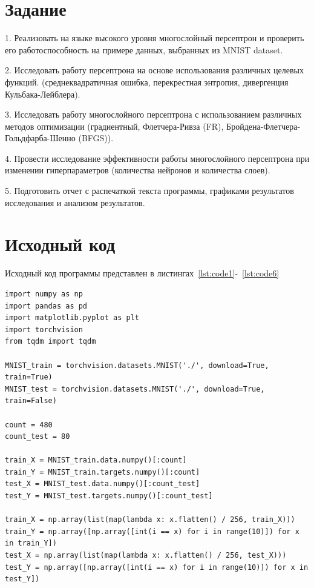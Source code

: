 \documentclass[a4paper, 14pt]{extarticle}
\begin{document}
\renewcommand{\ttdefault}{pcr}

\setlength{\tabcolsep}{3pt}
\newpage
\setcounter{page}{2}

\section{Задание}\label{Sect::task}
1. Реализовать на языке высокого уровня многослойный персептрон и 
проверить его работоспособность на примере данных, выбранных из 
MNIST dataset. 

2. Исследовать работу персептрона на основе использования различных 
целевых функций. (среднеквадратичная ошибка, перекрестная 
энтропия, дивергенция Кульбака-Лейблера).

3. Исследовать работу многослойного персептрона с использованием 
различных методов оптимизации (градиентный, Флетчера-Ривза (FR), 
Бройдена-Флетчера-Гольдфарба-Шенно (BFGS)).

4. Провести исследование эффективности работы многослойного 
персептрона при изменении гиперпараметров (количества нейронов и 
количества слоев).

5. Подготовить отчет с распечаткой текста программы, графиками 
результатов исследования и анализом результатов.
\newpage
\section{Исходный код}

Исходный код программы представлен в листингах~\ref{lst:code1}-~\ref{lst:code6}

\begin{lstlisting}[language={},caption={Подготовка датасета},label={lst:code1}, breaklines=true]
import numpy as np
import pandas as pd
import matplotlib.pyplot as plt
import torchvision
from tqdm import tqdm

MNIST_train = torchvision.datasets.MNIST('./', download=True, train=True)
MNIST_test = torchvision.datasets.MNIST('./', download=True, train=False)

count = 480
count_test = 80

train_X = MNIST_train.data.numpy()[:count]
train_Y = MNIST_train.targets.numpy()[:count]
test_X = MNIST_test.data.numpy()[:count_test]
test_Y = MNIST_test.targets.numpy()[:count_test]

train_X = np.array(list(map(lambda x: x.flatten() / 256, train_X)))
train_Y = np.array([np.array([int(i == x) for i in range(10)]) for x in train_Y])
test_X = np.array(list(map(lambda x: x.flatten() / 256, test_X)))
test_Y = np.array([np.array([int(i == x) for i in range(10)]) for x in test_Y])
\end{lstlisting}
\end{document}
